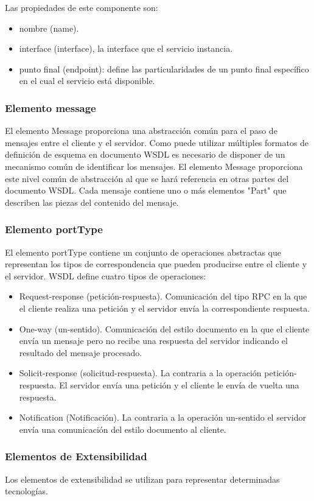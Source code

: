 Las propiedades de este componente son:
\begin{itemize}
	\item nombre (name).
	\item interface (interface), la interface que el servicio instancia.
	\item punto final (endpoint): define las particularidades de un punto final específico en el cual el servicio está disponible.
\end{itemize}

\subsubsection*{Elemento message}

El elemento Message proporciona una abstracción común para el paso de mensajes entre el cliente y el servidor. Como puede utilizar múltiples formatos de definición de esquema en documento WSDL es necesario de disponer de un mecanismo común de identificar los mensajes. El elemento Message proporciona este nivel común de abstracción al que se hará referencia en otras partes del documento WSDL. Cada mensaje contiene uno o más elementos "Part" que describen las piezas del contenido del mensaje.

\subsubsection*{Elemento portType}

El elemento portType contiene un conjunto de operaciones abstractas que representan los tipos de correspondencia que pueden producirse entre el cliente y el servidor.
WSDL define cuatro tipos de operaciones:

\begin{itemize}
	\item Request-response (petición-respuesta). Comunicación del tipo RPC en la que el cliente realiza una petición y el servidor envía la correspondiente respuesta.
	\item One-way (un-sentido). Comunicación del estilo documento en la que el cliente envía un mensaje pero no recibe una respuesta del servidor indicando el resultado del mensaje procesado.
	\item Solicit-response (solicitud-respuesta). La contraria a la operación petición-respuesta. El servidor envía una petición y el cliente le envía de vuelta una respuesta.
	\item Notification (Notificación). La contraria a la operación un-sentido el servidor envía una comunicación del estilo documento al cliente.
\end{itemize}

\subsubsection{Elementos de Extensibilidad}

Los elementos de extensibilidad se utilizan para representar determinadas tecnologías.

